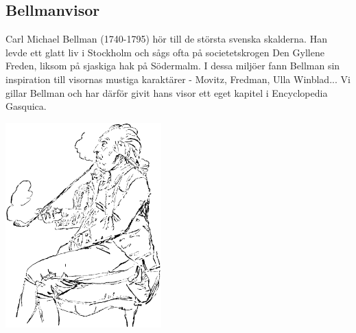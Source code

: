 \begin{flushleft}
\section{Bellmanvisor}
{\Large Carl Michael Bellman (1740-1795) hör till de största svenska skalderna.
Han levde ett glatt liv i Stockholm och sågs ofta på societetskrogen Den Gyllene Freden, liksom på sjaskiga hak på Södermalm.
I dessa miljöer fann Bellman sin inspiration till visornas mustiga karaktärer - Movitz, Fredman, Ulla Winblad...
Vi gillar Bellman och har därför givit hans visor ett eget kapitel i Encyclopedia Gasquica.}
\end{flushleft}

\vspace{2cm}
\begin{center}
\includegraphics[width=6cm]{bilder/bellman.png}
\end{center}
\newpage

\newpage
{}
\newpage
{}
\newpage
{}
